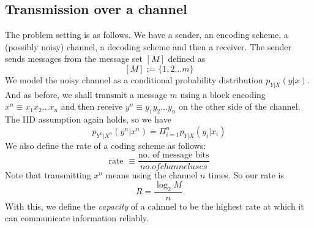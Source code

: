\subsection{Transmission over a channel}
The problem setting is as follows. We have a sender, an encoding scheme, a (possibly noisy) channel, a decoding scheme and then a receiver. The sender sends messages from the message set $[M]$ defined as
\[[M] := \{1,2\dots m\}\]
We model the noisy channel as a conditional probability distribution $p_{Y|X}(y|x)$. And as before, we shall transmit a message $m$ using a block encoding $x^n \equiv x_1x_2\dots x_n$ and then receive $y^n \equiv y_1y_2\dots y_n$ on the other side of the channel. The IID assumption again holds, so we have
\[p_{Y^n|X^n}(y^n|x^n) = \Pi_{i=1}^np_{Y|X}(y_i|x_i)\]
We also define the rate of a coding scheme as follows:
\[\text{rate } \equiv \frac{\text{no. of message bits}}{no. of channel uses}\]
Note that transmitting $x^n$ means using the channel $n$ times. So our rate is
\[R = \frac{\log_2{M}}{n}\]
With this, we define the \textit{capacity} of a cahnnel to be the highest rate at which it can communicate information reliably.